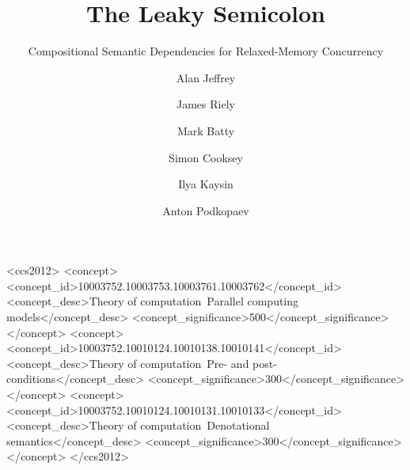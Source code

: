 \documentclass[acmsmall,screen,review]{acmart}\settopmatter{printfolios=true}
\theoremstyle{acmdefinition}
\begin{document}
\title{The Leaky Semicolon}
\subtitle{Compositional Semantic Dependencies for Relaxed-Memory Concurrency}
\author{Alan Jeffrey}

\author{James Riely}

\author{Mark Batty}

\author{Simon Cooksey}
\orcid{}

\author{Ilya Kaysin}
\orcid{}

\author{Anton Podkopaev}
\orcid{}

\begin{abstract}

\end{abstract}

\begin{CCSXML}
<ccs2012>
   <concept>
       <concept_id>10003752.10003753.10003761.10003762</concept_id>
       <concept_desc>Theory of computation~Parallel computing models</concept_desc>
       <concept_significance>500</concept_significance>
       </concept>
   <concept>
       <concept_id>10003752.10010124.10010138.10010141</concept_id>
       <concept_desc>Theory of computation~Pre- and post-conditions</concept_desc>
       <concept_significance>300</concept_significance>
       </concept>
   <concept>
       <concept_id>10003752.10010124.10010131.10010133</concept_id>
       <concept_desc>Theory of computation~Denotational semantics</concept_desc>
       <concept_significance>300</concept_significance>
       </concept>
 </ccs2012>
\end{CCSXML}
\end{document}
